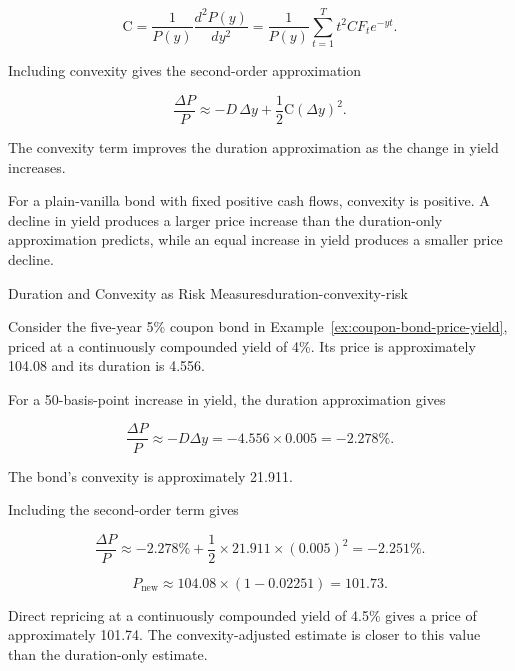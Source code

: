 \begin{equation}
\mathrm{C}
=
\frac{1}{P(y)}
\frac{d^2P(y)}{dy^2}
=
\frac{1}{P(y)}
\sum_{t=1}^{T}
t^2 CF_t e^{-yt}.
\label{eq:ch8-convexity}
\end{equation}

Including convexity gives the second-order approximation

\begin{equation}
\frac{\Delta P}{P}
\approx
-D\,\Delta y
+
\frac{1}{2}\mathrm{C}(\Delta y)^2.
\label{eq:ch8-duration-convexity-approx}
\end{equation}

The convexity term improves the duration approximation as the change in yield increases.

For a plain-vanilla bond with fixed positive cash flows, convexity is positive. A decline in yield produces a larger price increase than the duration-only approximation predicts, while an equal increase in yield produces a smaller price decline.

\begin{example}{Duration and Convexity as Risk Measures}{duration-convexity-risk}

Consider the five-year 5\% coupon bond in Example~\ref{ex:coupon-bond-price-yield}, priced at a continuously compounded yield of 4\%. Its price is approximately 104.08 and its duration is 4.556. 

For a 50-basis-point increase in yield, the duration approximation gives

\[
\frac{\Delta P}{P}
\approx
-D\Delta y
=
-4.556\times 0.005
=
-2.278\%.
\]

The bond's convexity is approximately 21.911.

Including the second-order term gives

\[
\frac{\Delta P}{P}
\approx
-2.278\%
+\frac{1}{2}\times 21.911\times (0.005)^2
=
-2.251\%.
\]

\[
P_{\mathrm{new}}
\approx
104.08\times(1-0.02251)
=
101.73.
\]

Direct repricing at a continuously compounded yield
of 4.5\% gives a price of approximately 101.74.
The convexity-adjusted estimate is closer to this
value than the duration-only estimate.

\end{example}

